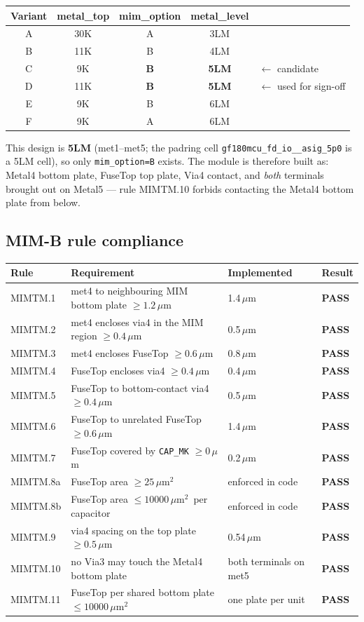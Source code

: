 \documentclass[11pt,a4paper]{article}
\newcommand{\PASS}{\textcolor{green!50!black}{\textbf{PASS}}}
\newcommand{\um}{\,$\mu$m}
\newcommand{\umsq}{\,$\mu$m$^2$}
\begin{document}
\begin{center}
\begin{tabular}{@{}ccccl@{}}
\toprule
\textbf{Variant} & \textbf{metal\_top} & \textbf{mim\_option} & \textbf{metal\_level} & \\
\midrule
A & 30K & A & 3LM & \\
B & 11K & B & 4LM & \\
C & 9K  & \textbf{B} & \textbf{5LM} & $\leftarrow$ candidate \\
D & 11K & \textbf{B} & \textbf{5LM} & $\leftarrow$ used for sign-off \\
E & 9K  & B & 6LM & \\
F & 9K  & A & 6LM & \\
\bottomrule
\end{tabular}
\end{center}

This design is \textbf{5LM} (met1--met5; the padring cell \texttt{gf180mcu\_fd\_io\_\_asig\_5p0}
is a 5LM cell), so only \texttt{mim\_option=B} exists. The module is therefore built as:
Metal4 bottom plate, FuseTop top plate, Via4 contact, and \emph{both} terminals brought out on
Metal5 --- rule MIMTM.10 forbids contacting the Metal4 bottom plate from below.

\subsection*{MIM-B rule compliance}

\begin{longtable}{@{}llll@{}}
\toprule
\textbf{Rule} & \textbf{Requirement} & \textbf{Implemented} & \textbf{Result} \\
\midrule
\endhead
MIMTM.1  & met4 to neighbouring MIM bottom plate $\geq 1.2$\um & 1.4\um  & \PASS \\
MIMTM.2  & met4 encloses via4 in the MIM region $\geq 0.4$\um  & 0.5\um  & \PASS \\
MIMTM.3  & met4 encloses FuseTop $\geq 0.6$\um                 & 0.8\um  & \PASS \\
MIMTM.4  & FuseTop encloses via4 $\geq 0.4$\um                 & 0.4\um  & \PASS \\
MIMTM.5  & FuseTop to bottom-contact via4 $\geq 0.4$\um        & 0.5\um  & \PASS \\
MIMTM.6  & FuseTop to unrelated FuseTop $\geq 0.6$\um          & 1.4\um  & \PASS \\
MIMTM.7  & FuseTop covered by \texttt{CAP\_MK} $\geq 0$\um     & 0.2\um  & \PASS \\
MIMTM.8a & FuseTop area $\geq 25$\umsq                         & enforced in code & \PASS \\
MIMTM.8b & FuseTop area $\leq 10000$\umsq\ per capacitor       & enforced in code & \PASS \\
MIMTM.9  & via4 spacing on the top plate $\geq 0.5$\um         & 0.54\um & \PASS \\
MIMTM.10 & no Via3 may touch the Metal4 bottom plate           & both terminals on met5 & \PASS \\
MIMTM.11 & FuseTop per shared bottom plate $\leq 10000$\umsq   & one plate per unit & \PASS \\
\bottomrule
\end{longtable}
\end{document}
